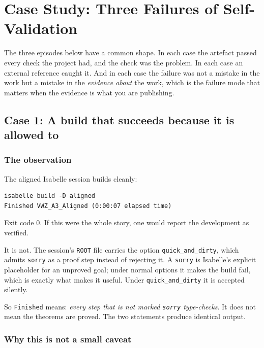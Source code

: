 \section{Case Study: Three Failures of Self-Validation}
\label{sec:case-study}

The three episodes below have a common shape. In each case the artefact passed
every check the project had, and the check was the problem. In each case an
external reference caught it. And in each case the failure was not a mistake in
the work but a mistake in the \emph{evidence about} the work, which is the
failure mode that matters when the evidence is what you are publishing.

\subsection{Case 1: A build that succeeds because it is allowed to}
\label{sec:case-study-quick-and-dirty}

\subsubsection{The observation}

The aligned Isabelle session builds cleanly:

\begin{lstlisting}
isabelle build -D aligned
Finished VWZ_A3_Aligned (0:00:07 elapsed time)
\end{lstlisting}

Exit code 0. If this were the whole story, one would report the development as
verified.

It is not. The session's \texttt{ROOT} file carries the option
\texttt{quick\_and\_dirty}, which admits \texttt{sorry} as a proof step instead
of rejecting it. A \texttt{sorry} is Isabelle's explicit placeholder for an
unproved goal; under normal options it makes the build fail, which is exactly
what makes it useful. Under \texttt{quick\_and\_dirty} it is accepted silently.

So \texttt{Finished} means: \emph{every step that is not marked \texttt{sorry}
type-checks}. It does not mean the theorems are proved. The two statements
produce identical output.

\subsubsection{Why this is not a small caveat}

